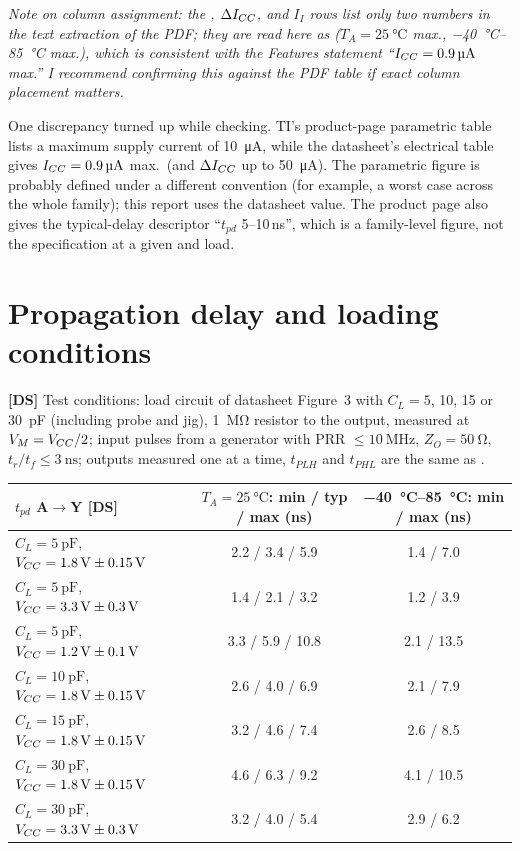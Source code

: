 \documentclass[11pt,a4paper]{article}
\newcommand{\DS}{\textbf{[DS]}}
\begin{document}
\emph{Note on column assignment: the \Icc, $\Delta I_{CC}$, \Ioff{} and $I_I$ rows list only two numbers in the text extraction of the PDF; they are read here as ($T_A=\SI{25}{\celsius}$ max., \SIrange{-40}{85}{\celsius} max.), which is consistent with the Features statement ``$I_{CC}=\SI{0.9}{\micro\ampere}$ max.'' I recommend confirming this against the PDF table if exact column placement matters.}

One discrepancy turned up while checking. TI's product-page parametric table lists a maximum supply current of \SI{10}{\micro\ampere}, while the datasheet's electrical table gives $I_{CC}=\SI{0.9}{\micro\ampere}$ max.\ (and $\Delta I_{CC}$ up to \SI{50}{\micro\ampere}). The parametric figure is probably defined under a different convention (for example, a worst case across the whole family); this report uses the datasheet value. The product page also gives the typical-delay descriptor ``$t_{pd}$ 5--10\,ns'', which is a family-level figure, not the specification at a given \Vcc{} and load.

\section{Propagation delay and loading conditions}
\DS{} Test conditions: load circuit of datasheet Figure~3 with $C_L=5$, 10, 15 or \SI{30}{\pico\farad} (including probe and jig), \SI{1}{\mega\ohm} resistor to the output, measured at $V_M=V_{CC}/2$; input pulses from a generator with PRR $\le\SI{10}{\mega\hertz}$, $Z_O=\SI{50}{\ohm}$, $t_r/t_f\le\SI{3}{\nano\second}$; outputs measured one at a time, $t_{PLH}$ and $t_{PHL}$ are the same as \tpd.

\begin{table}[H]
  \centering\small
  \begin{tabular}{@{}l c c@{}}
    \toprule
    $t_{pd}$ A$\to$Y \DS & $T_A=\SI{25}{\celsius}$: min / typ / max (ns) & \SIrange{-40}{85}{\celsius}: min / max (ns)\\
    \midrule
    $C_L=\SI{5}{\pico\farad}$, $V_{CC}=\SI{1.8}{\volt}\pm\SI{0.15}{\volt}$ & 2.2 / 3.4 / 5.9 & 1.4 / 7.0\\
    $C_L=\SI{5}{\pico\farad}$, $V_{CC}=\SI{3.3}{\volt}\pm\SI{0.3}{\volt}$ & 1.4 / 2.1 / 3.2 & 1.2 / 3.9\\
    $C_L=\SI{5}{\pico\farad}$, $V_{CC}=\SI{1.2}{\volt}\pm\SI{0.1}{\volt}$ & 3.3 / 5.9 / 10.8 & 2.1 / 13.5\\
    $C_L=\SI{10}{\pico\farad}$, $V_{CC}=\SI{1.8}{\volt}\pm\SI{0.15}{\volt}$ & 2.6 / 4.0 / 6.9 & 2.1 / 7.9\\
    $C_L=\SI{15}{\pico\farad}$, $V_{CC}=\SI{1.8}{\volt}\pm\SI{0.15}{\volt}$ & 3.2 / 4.6 / 7.4 & 2.6 / 8.5\\
    $C_L=\SI{30}{\pico\farad}$, $V_{CC}=\SI{1.8}{\volt}\pm\SI{0.15}{\volt}$ & 4.6 / 6.3 / 9.2 & 4.1 / 10.5\\
    $C_L=\SI{30}{\pico\farad}$, $V_{CC}=\SI{3.3}{\volt}\pm\SI{0.3}{\volt}$ & 3.2 / 4.0 / 5.4 & 2.9 / 6.2\\
    \bottomrule
  \end{tabular}
\end{table}
\end{document}
